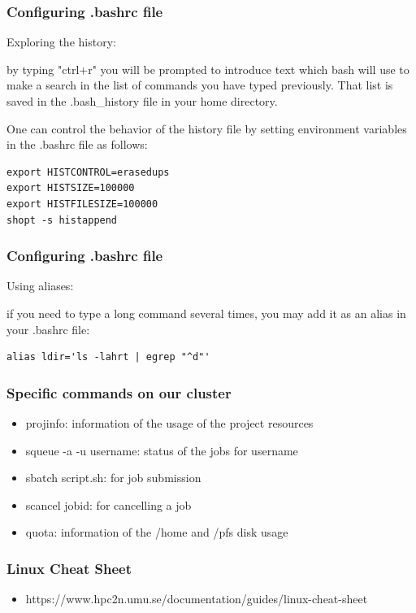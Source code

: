 \begin{frame}[fragile]
	\frametitle{Configuring .bashrc file}

Exploring the history:

by typing "ctrl+r" you will be prompted to introduce text which bash 
will use to make a search in the list of commands you have typed previously.
That list is saved in the .bash\_history file in your home directory.  

One can control the behavior of the history file by setting environment variables
in the .bashrc file as follows:

\begin{verbatim}
export HISTCONTROL=erasedups
export HISTSIZE=100000
export HISTFILESIZE=100000
shopt -s histappend
\end{verbatim}


\end{frame}
\begin{frame}[fragile]
	\frametitle{Configuring .bashrc file}

Using aliases:

if you need to type a long command several times, you may add it as an alias in 
your .bashrc file:

\begin{verbatim}
alias ldir='ls -lahrt | egrep "^d"'
\end{verbatim}

\end{frame}
\begin{frame}[fragile]
	\frametitle{Specific commands on our cluster}

\begin{itemize}
\item projinfo: information of the usage of the project resources
\item squeue -a -u username: status of the jobs for username
\item sbatch script.sh: for job submission
\item scancel jobid: for cancelling a job
\item quota: information of the /home and /pfs disk usage
\end{itemize}

\end{frame}

\begin{frame}
	\frametitle{Linux Cheat Sheet}

\begin{itemize}
\item https://www.hpc2n.umu.se/documentation/guides/linux-cheat-sheet
\end{itemize}

\end{frame}
